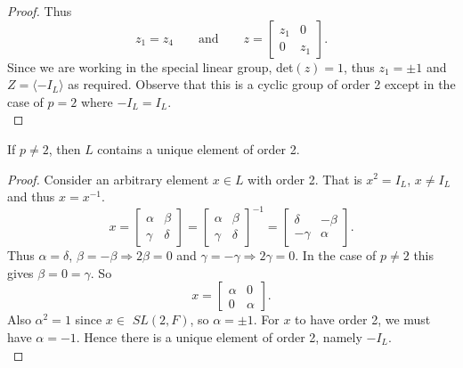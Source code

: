 \begin{proof}
\noindent Thus \begin{equation*} z_1 = z_4 \qquad  \text{and} \qquad z =  \begin{bmatrix} z_1 & 0 \\ 0 & z_1 \end{bmatrix}. \end{equation*}
\noindent Since we are working in the special linear group, det$(z)=1$, thus $z_1 = \pm 1$ and $Z = \langle - I_L \rangle$ as required. Observe that this is a cyclic group of order 2 except in the case of $p=2$ where $- I_L = I_L$. \\
\end{proof}

\begin{lemma} \label{6.2b} If $p\neq 2$, then $L$ contains a unique element of order 2. \\
\end{lemma}

\begin{proof} Consider an arbitrary element $x \in L$ with order 2. That is $x^2 = I_L$, $x \neq I_L$ and thus $x=x^{-1}$.
\begin{equation*} x = \begin{bmatrix} \alpha & \beta \\ \gamma & \delta \end{bmatrix} = \begin{bmatrix} \alpha & \beta \\ \gamma & \delta \end{bmatrix}^{-1} = \begin{bmatrix} \delta & - \beta \\ - \gamma & \alpha \end{bmatrix}.
\end{equation*}
\noindent Thus $\alpha = \delta$, $\beta = - \beta \Rightarrow 2\beta = 0$ and $\gamma = - \gamma \Rightarrow 2\gamma = 0$. In the case of $p \neq 2$ this gives $\beta = 0 = \gamma$. So
\begin{equation*} x = \begin{bmatrix} \alpha & 0 \\ 0 & \alpha \end{bmatrix}.
\end{equation*}
\noindent Also $\alpha ^2 = 1$ since $x \in$ $SL(2,F)$, so $\alpha = \pm 1$. For $x$ to have order 2, we must have $\alpha = - 1$. Hence there is a unique element of order 2, namely $- I_L$.
\\
\end{proof}

